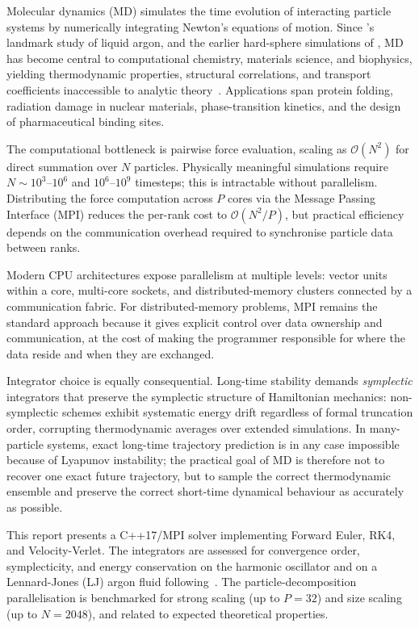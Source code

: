 \documentclass[10pt,twocolumn]{article}
\begin{document}
Molecular dynamics (MD) simulates the time evolution of interacting particle
systems by numerically integrating Newton's equations of motion. Since
\citealt{Rahman1964}'s landmark study of liquid argon, and the earlier
hard-sphere simulations of \citet{AlderWainwright1957}, MD has become central
to computational chemistry, materials science, and biophysics, yielding
thermodynamic properties, structural correlations, and transport coefficients
inaccessible to analytic theory~\citep{FrenkelSmit2002,AllenTildesley2017}.
Applications span protein folding, radiation damage in nuclear materials,
phase-transition kinetics, and the design of pharmaceutical binding sites.

The computational bottleneck is pairwise force evaluation, scaling as
$\mathcal{O}(N^2)$ for direct summation over $N$ particles.
Physically meaningful simulations require $N\sim10^3$--$10^6$ and
$10^6$--$10^9$ timesteps; this is intractable without parallelism.
Distributing the force computation across $P$ cores via the Message Passing
Interface (MPI) reduces the per-rank cost to $\mathcal{O}(N^2/P)$, but
practical efficiency depends on the communication overhead required to
synchronise particle data between ranks.

Modern CPU architectures expose parallelism at multiple levels: vector units
within a core, multi-core sockets, and distributed-memory clusters connected
by a communication fabric. For distributed-memory problems, MPI remains the
standard approach because it gives explicit control over data ownership and
communication, at the cost of making the programmer responsible for where the
data reside and when they are exchanged.

Integrator choice is equally consequential. Long-time stability demands
\emph{symplectic} integrators that preserve the symplectic structure of
Hamiltonian mechanics: non-symplectic schemes exhibit systematic energy drift
regardless of formal truncation order, corrupting thermodynamic averages
over extended simulations. In many-particle systems, exact long-time
trajectory prediction is in any case impossible because of Lyapunov instability;
the practical goal of MD is therefore not to recover one exact future
trajectory, but to sample the correct thermodynamic ensemble and preserve
the correct short-time dynamical behaviour as accurately as possible.

This report presents a C++17/MPI solver implementing Forward Euler, RK4, and
Velocity-Verlet. The integrators are assessed for convergence order,
symplecticity, and energy conservation on the harmonic oscillator and on a
Lennard-Jones (LJ) argon fluid following~\citealt{Rahman1964}. The
particle-decomposition parallelisation is benchmarked for strong scaling
(up to $P=32$) and size scaling (up to $N=2048$), and related to expected
theoretical properties.
\end{document}
